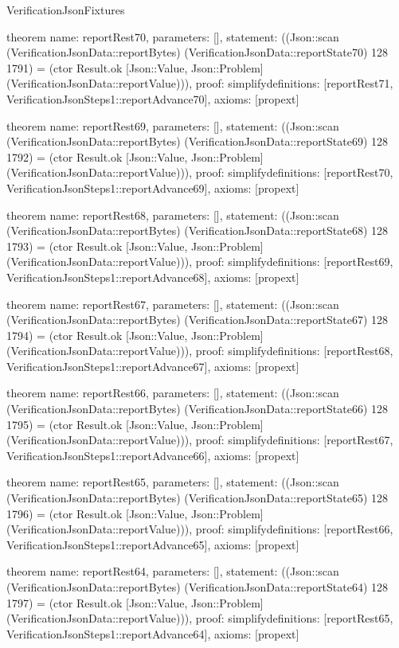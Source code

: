 \begin{lexlean}{VerificationJsonFixtures}
\begin{semanticmodule}
theorem{
  name: reportRest70,
  parameters: [],
  statement: ((Json::scan (VerificationJsonData::reportBytes) (VerificationJsonData::reportState70) 128 1791) = (ctor Result.ok [Json::Value, Json::Problem] (VerificationJsonData::reportValue))),
  proof: simplify{definitions: [reportRest71, VerificationJsonSteps1::reportAdvance70]},
  axioms: [propext]
}

theorem{
  name: reportRest69,
  parameters: [],
  statement: ((Json::scan (VerificationJsonData::reportBytes) (VerificationJsonData::reportState69) 128 1792) = (ctor Result.ok [Json::Value, Json::Problem] (VerificationJsonData::reportValue))),
  proof: simplify{definitions: [reportRest70, VerificationJsonSteps1::reportAdvance69]},
  axioms: [propext]
}

theorem{
  name: reportRest68,
  parameters: [],
  statement: ((Json::scan (VerificationJsonData::reportBytes) (VerificationJsonData::reportState68) 128 1793) = (ctor Result.ok [Json::Value, Json::Problem] (VerificationJsonData::reportValue))),
  proof: simplify{definitions: [reportRest69, VerificationJsonSteps1::reportAdvance68]},
  axioms: [propext]
}

theorem{
  name: reportRest67,
  parameters: [],
  statement: ((Json::scan (VerificationJsonData::reportBytes) (VerificationJsonData::reportState67) 128 1794) = (ctor Result.ok [Json::Value, Json::Problem] (VerificationJsonData::reportValue))),
  proof: simplify{definitions: [reportRest68, VerificationJsonSteps1::reportAdvance67]},
  axioms: [propext]
}

theorem{
  name: reportRest66,
  parameters: [],
  statement: ((Json::scan (VerificationJsonData::reportBytes) (VerificationJsonData::reportState66) 128 1795) = (ctor Result.ok [Json::Value, Json::Problem] (VerificationJsonData::reportValue))),
  proof: simplify{definitions: [reportRest67, VerificationJsonSteps1::reportAdvance66]},
  axioms: [propext]
}

theorem{
  name: reportRest65,
  parameters: [],
  statement: ((Json::scan (VerificationJsonData::reportBytes) (VerificationJsonData::reportState65) 128 1796) = (ctor Result.ok [Json::Value, Json::Problem] (VerificationJsonData::reportValue))),
  proof: simplify{definitions: [reportRest66, VerificationJsonSteps1::reportAdvance65]},
  axioms: [propext]
}

theorem{
  name: reportRest64,
  parameters: [],
  statement: ((Json::scan (VerificationJsonData::reportBytes) (VerificationJsonData::reportState64) 128 1797) = (ctor Result.ok [Json::Value, Json::Problem] (VerificationJsonData::reportValue))),
  proof: simplify{definitions: [reportRest65, VerificationJsonSteps1::reportAdvance64]},
  axioms: [propext]
}


\end{semanticmodule}
\end{lexlean}
